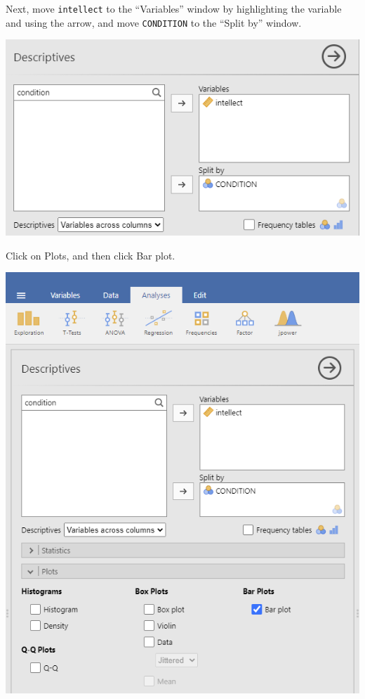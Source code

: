 \documentclass[
]{book}
\begin{document}
Next, move \texttt{intellect} to the ``Variables'' window by highlighting the variable and using the arrow, and move \texttt{CONDITION} to the ``Split by'' window.

\includegraphics{img/GraphingVariablesForIndTest.png}

Click on {Plots}, and then click {Bar plot}.

\includegraphics{img/GraphingCommandsForBarGraph.png}
\end{document}
